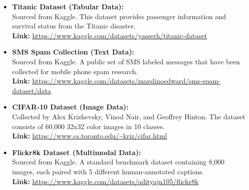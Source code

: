 \documentclass[twoside]{hcmut-report}
\begin{document}
\begin{itemize}
    \item \textbf{Titanic Dataset (Tabular Data):} \\
    Sourced from Kaggle. This dataset provides passenger information and survival status from the Titanic disaster. \\
    \textbf{Link:} \url{https://www.kaggle.com/datasets/yasserh/titanic-dataset}

    \item \textbf{SMS Spam Collection (Text Data):} \\
    Sourced from Kaggle. A public set of SMS labeled messages that have been collected for mobile phone spam research. \\
    \textbf{Link:} \url{https://www.kaggle.com/datasets/marslinoedward/sms-spam-dataset/data}

    \item \textbf{CIFAR-10 Dataset (Image Data):} \\
    Collected by Alex Krizhevsky, Vinod Nair, and Geoffrey Hinton. The dataset consists of 60,000 32x32 color images in 10 classes. \\
    \textbf{Link:} \url{https://www.cs.toronto.edu/~kriz/cifar.html}

    \item \textbf{Flickr8k Dataset (Multimodal Data):} \\
    Sourced from Kaggle. A standard benchmark dataset containing 8,000 images, each paired with 5 different human-annotated captions. \\
    \textbf{Link:} \url{https://www.kaggle.com/datasets/adityajn105/flickr8k}
\end{itemize}



\end{document}
